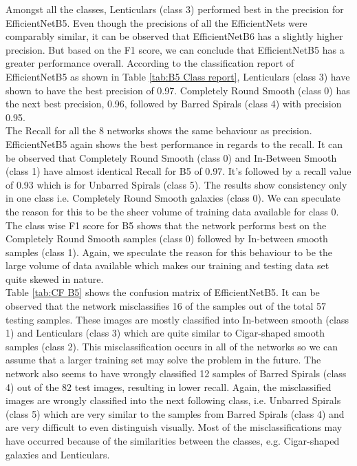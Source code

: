 \documentclass[fleqn,usenatbib]{mnras}
\begin{document}
Amongst all the classes, Lenticulars (class 3) performed best in the precision for EfficientNetB5. Even though the precisions of all the EfficientNets were comparably similar, it can be observed that EfficientNetB6 has a slightly higher precision. But based on the F1 score, we can conclude that EfficientNetB5 has a greater performance overall. According to the classification report of EfficientNetB5 as shown in Table \ref{tab:B5 Class report}, Lenticulars (class 3) have shown to have the best precision of 0.97. Completely Round Smooth (class 0) has the next best precision, 0.96, followed by Barred Spirals (class 4) with precision 0.95.\\ 
\hspace*{0.25 in}The Recall for all the 8 networks shows the same behaviour as precision. EfficientNetB5 again shows the best performance in regards to the recall. It can be observed that Completely Round Smooth (class 0) and In-Between Smooth (class 1) have almost identical Recall for B5 of 0.97. It's followed by a recall value of 0.93 which is for Unbarred Spirals (class 5). The results show consistency only in one class i.e. Completely Round Smooth galaxies (class 0). We can speculate the reason for this to be the sheer volume of training data available for class 0. The class wise F1 score for B5 shows that the network performs best on the Completely Round Smooth samples (class 0) followed by In-between smooth samples (class 1). Again, we speculate the reason for this behaviour to be the large volume of data available which makes our training and testing data set quite skewed in nature.\\

\hspace*{0.25 in}Table \ref{tab:CF B5} shows the confusion matrix of EfficientNetB5. It can be observed that the network misclassifies 16 of the samples out of the total 57 testing samples. These images are mostly classified into In-between smooth (class 1) and Lenticulars (class 3) which are quite similar to Cigar-shaped smooth samples (class 2). This misclassification occurs in all of the networks so we can assume that a larger training set may solve the problem in the future. The network also seems to have wrongly classified 12 samples of Barred Spirals (class 4) out of the 82 test images, resulting in lower recall. Again, the misclassified images are wrongly classified into the next following class, i.e. Unbarred Spirals (class 5) which are very similar to the samples from Barred Spirals (class 4) and are very difficult to even distinguish visually. Most of the misclassifications may have occurred because of the similarities between the classes, e.g. Cigar-shaped galaxies and Lenticulars. \\
\end{document}
